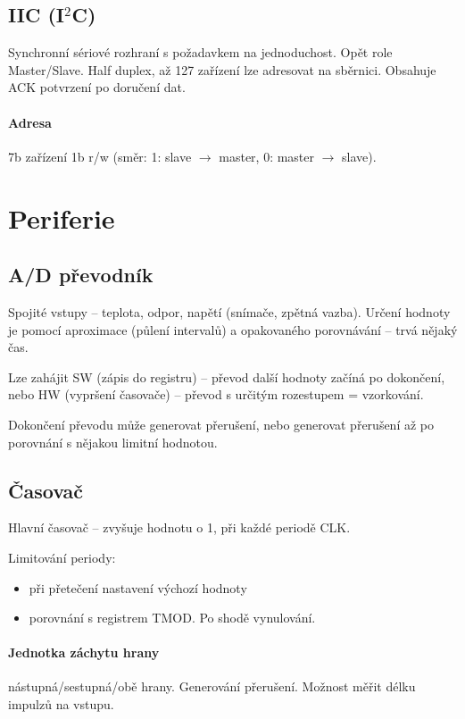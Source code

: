 \documentclass[a4paper, 11pt]{report}
\begin{document}
\subsection{IIC (I$^2$C)}
Synchronní sériové rozhraní s požadavkem na jednoduchost. Opět role Master/Slave. Half duplex, až 127 zařízení lze adresovat na sběrnici. Obsahuje ACK potvrzení po doručení dat.

\paragraph{Adresa} 7b zařízení 1b r/w (směr: 1: slave $\to$ master, 0: master $\to$ slave).

\section{Periferie}

\subsection{A/D převodník}
Spojité vstupy -- teplota, odpor, napětí (snímače, zpětná vazba). Určení hodnoty je pomocí aproximace (půlení intervalů) a opakovaného porovnávání -- trvá nějaký čas.

Lze zahájit SW (zápis do registru) -- převod další hodnoty začíná po dokončení, nebo HW (vypršení časovače) -- převod s určitým rozestupem = vzorkování.

Dokončení převodu může generovat přerušení, nebo generovat přerušení až po porovnání s nějakou limitní hodnotou.

\subsection{Časovač}
Hlavní časovač -- zvyšuje hodnotu o 1, při každé periodě CLK.

Limitování periody: 
\begin{itemize}
	\item při přetečení nastavení výchozí hodnoty
	\item porovnání s registrem TMOD. Po shodě vynulování.
\end{itemize}

\paragraph{Jednotka záchytu hrany}
nástupná/sestupná/obě hrany. Generování přerušení. Možnost měřit délku impulzů na vstupu.
\end{document}
